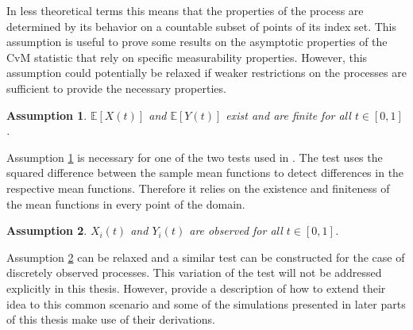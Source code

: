 \documentclass[12pt, a4paper]{article}
\theoremstyle{MAstyle} \newtheorem{assumption}{Assumption}[section]
\theoremstyle{MAstyle} \newtheorem{definition}{Definition}[section]
\theoremstyle{MAstyle} \newtheorem{theorem}{Theorem}[section]
\begin{document}
			In less theoretical terms this means that the properties of the process are determined by its behavior on a countable subset of points of its index set. This assumption is useful to prove some results on the asymptotic properties of the CvM statistic that rely on specific measurability properties. However, this assumption could potentially be relaxed if weaker restrictions on the processes are sufficient to provide the necessary properties.
		
			\begin{assumption}\label{mean_existence}
				$\mathbb{E}\left[X(t)\right]$ and $\mathbb{E}\left[Y(t)\right]$ exist and are finite for all $t \in [0, 1]$.
			\end{assumption}
			Assumption \ref{mean_existence} is necessary for one of the two tests used in \cite{bugni_permutation_2021}. The test uses the squared difference between the sample mean functions to detect differences in the respective mean functions. Therefore it relies on the existence and finiteness of the mean functions in every point of the domain.
		
			\begin{assumption}\label{continuous_observation}
				$X_i(t)$ and $Y_i(t)$ are observed for all $t \in [0,1]$.
			\end{assumption}
			Assumption \ref{continuous_observation} can be relaxed and a similar test can be constructed for the case of discretely observed processes. This variation of the test will not be addressed explicitly in this thesis. However, \cite{bugni_permutation_2021} provide a description of how to extend their idea to this common scenario and some of the simulations presented in later parts of this thesis make use of their derivations.
	
\end{document}
